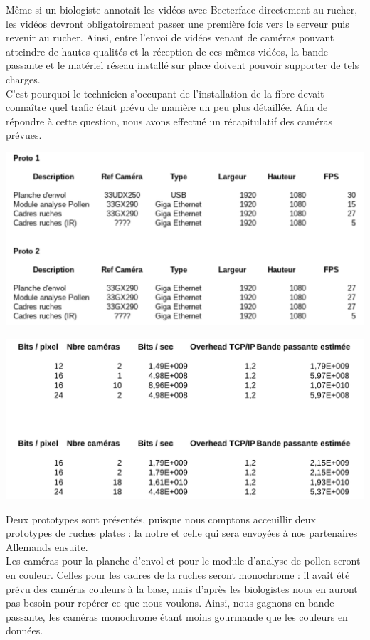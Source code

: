 \documentclass[11pt,french,a4paper]{report}
\begin{document}
Même si un biologiste annotait les vidéos avec Beeterface directement au rucher, les vidéos devront obligatoirement passer une première 
fois vers le serveur puis revenir au rucher. Ainsi, entre l'envoi de vidéos venant de caméras pouvant atteindre de hautes
qualités et la réception de ces mêmes vidéos, la bande passante et le matériel réseau installé sur place 
doivent pouvoir supporter de tels charges. \\

C'est pourquoi le technicien s'occupant de l'installation de la fibre devait connaître quel trafic était prévu de manière un
peu plus détaillée. Afin de répondre à cette question, nous avons effectué un récapitulatif des caméras prévues. 


\includegraphics[scale=0.2]{../images/annexes/camera_bp.png} 

\includegraphics[scale=0.2]{../images/annexes/camera_bp2.png} 

Deux prototypes sont présentés, puisque nous comptons acceuillir deux prototypes de ruches plates : la notre et 
celle qui sera envoyées à nos partenaires Allemands ensuite. \\

Les caméras pour la planche d'envol et pour le module d'analyse de pollen seront en couleur. Celles pour les cadres de la ruches
seront monochrome : il avait été prévu des caméras couleurs à la base, mais d'après les biologistes nous en auront pas besoin pour 
repérer ce que nous voulons. Ainsi, nous gagnons en bande passante, les caméras monochrome étant moins gourmande que les couleurs 
en données. \\
\end{document}
